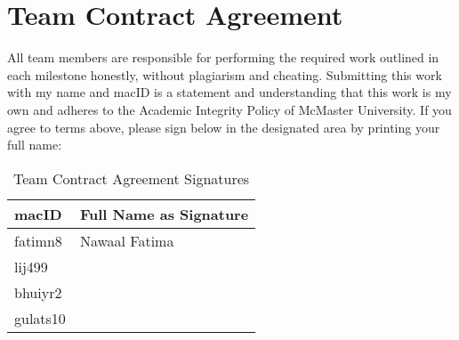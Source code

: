 \documentclass[titlepage]{article}
\begin{document}
\section{Team Contract Agreement}
All team members are responsible for performing the required work
outlined in each
milestone honestly, without plagiarism and cheating. Submitting this
work with my
name and macID is a statement and understanding that this work is my own and
adheres to the Academic Integrity Policy of McMaster University.
If you agree to terms above, please sign below in the designated area by printing your full name:
\begin{table}[]
    \centering
    \begin{tabular}{|l|l|}
    \hline
    macID   & Full Name as Signature \\ \hline
    fatimn8 & Nawaal Fatima          \\ \hline
    lij499  &                        \\ \hline
    bhuiyr2 &                        \\ \hline
    gulats10&                        \\ \hline
    \end{tabular}
    \caption{Team Contract Agreement Signatures}
    \label{tab:team-signatures}
    \end{table}
\end{document}
